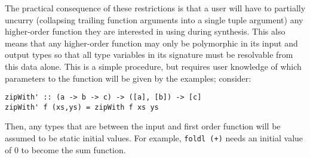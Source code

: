 The practical consequence of these restrictions is that a user will have to partially uncurry (collapsing trailing function arguments into a single tuple argument) any higher-order function they are interested in using during synthesis. This also means that any higher-order function may only be polymorphic in its input and output types so that all type variables in its signature must be resolvable from this data alone. This is a simple procedure, but requires user knowledge of which parameters to the function will be given by the examples; consider:

\begin{lstlisting}
zipWith' :: (a -> b -> c) -> ([a], [b]) -> [c]
zipWith' f (xs,ys) = zipWith f xs ys
\end{lstlisting}

Then, any types that are between the input and first order function will be assumed to be static initial values. For example, \texttt{foldl (+)} needs an initial value of 0 to become the sum function.

